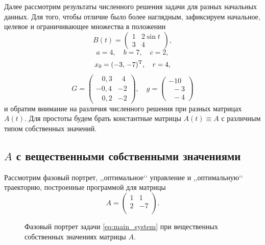 Далее рассмотрим результаты численного решения задачи для разных начальных данных. Для того, чтобы отличие было более наглядным, зафиксируем начальное, целевое и ограничивающее множества в положении
$$
        B(t) =
        \begin{pmatrix}
                1 & 2\sin t\\
                3 & 4
        \end{pmatrix}, 
$$
$$
        a = 4,\quad b = 7,\quad c = 2,
$$
$$
        x_0 = (-3,\,-7)^{\mathrm{T}},\quad r = 4,
$$
$$
        G =
        \begin{pmatrix}
                \;\;\;0{,}3 & \;\;4\\
                -0{,}4 & -2 \\
                \;\;\;0{,}2 & -2
        \end{pmatrix},
        \quad g =
        \begin{pmatrix}
                -10 \\
                \;\;-3 \\
                \;\;-4
        \end{pmatrix}
$$
и обратим внимание на различия численного решения при разных матрицах $A(t)$. Для простоты будем брать константные матрицы $A(t) \equiv A$ с различным типом собственных значений.


\subsection{$A$ с вещественными собственными значениями}

Рассмотрим фазовый портрет, ,,оптимальное‘‘ управление и ,,оптимальную‘‘ траекторию, построенные программой для матрицы
$$
        A =
        \begin{pmatrix}
        1 & 1 \\
        2 & -7 \\
        \end{pmatrix}.
$$
\begin{figure}[h]
\noindent{}
\caption{Фазовый портрет задачи \eqref{eq:main_system} при вещественных собственных значениях матрицы $A$.}
\end{figure}

